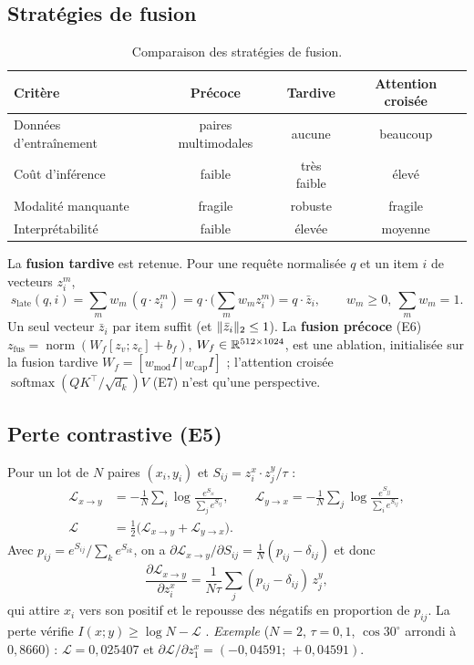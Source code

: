 \subsection{Stratégies de fusion}
\begin{table}[ht]\centering\small
\begin{tabular}{@{}lccc@{}}
\toprule
Critère & Précoce & Tardive & Attention croisée\\
\midrule
Données d'entraînement & paires multimodales & aucune & beaucoup\\
Coût d'inférence & faible & très faible & élevé\\
Modalité manquante & fragile & robuste & fragile\\
Interprétabilité & faible & élevée & moyenne\\
\bottomrule
\end{tabular}
\caption{Comparaison des stratégies de fusion.}
\end{table}
La \textbf{fusion tardive} est retenue. Pour une requête normalisée $q$ et un item $i$ de vecteurs $z_i^m$,
\begin{equation}
  s_{\text{late}}(q,i)=\sum_m w_m\,(q\cdot z_i^m)=q\cdot\Big(\sum_m w_m z_i^m\Big)=q\cdot\bar z_i,\qquad w_m\ge0,\ \sum_m w_m=1 .
\end{equation}
Un seul vecteur $\bar z_i$ par item suffit (et $\lVert \bar z_i\rVert_2\le 1$). La \textbf{fusion précoce} (E6)
$z_{\text{fus}}=\operatorname{norm}(W_f[z_v;z_c]+b_f)$, $W_f\in\mathbb{R}^{512\times1024}$, est une ablation, initialisée sur la fusion tardive
$W_f=[w_{\text{mod}}I\,|\,w_{\text{cap}}I]$ ; l'attention croisée $\operatorname{softmax}(QK^\top/\sqrt{d_k})V$ (E7) n'est qu'une
perspective.

\subsection{Perte contrastive (E5)}
Pour un lot de $N$ paires $(x_i,y_i)$ et $S_{ij}=z^x_i\!\cdot\! z^y_j/\tau$ :
\begin{align}
  \mathcal L_{x\to y}&=-\frac1N\sum_i\log\frac{e^{S_{ii}}}{\sum_j e^{S_{ij}}},\qquad
  \mathcal L_{y\to x}=-\frac1N\sum_j\log\frac{e^{S_{jj}}}{\sum_i e^{S_{ij}}},\\
  \mathcal L&=\tfrac12\big(\mathcal L_{x\to y}+\mathcal L_{y\to x}\big).
\end{align}
Avec $p_{ij}=e^{S_{ij}}/\sum_k e^{S_{ik}}$, on a $\partial\mathcal L_{x\to y}/\partial S_{ij}=\frac1N(p_{ij}-\delta_{ij})$ et donc
\begin{equation}
  \frac{\partial\mathcal L_{x\to y}}{\partial z^x_i}=\frac{1}{N\tau}\sum_j(p_{ij}-\delta_{ij})\,z^y_j ,
\end{equation}
qui attire $x_i$ vers son positif et le repousse des négatifs en proportion de $p_{ij}$. La perte vérifie
$I(x;y)\ge\log N-\mathcal L$ \cite{oord2018cpc}. \emph{Exemple} ($N=2$, $\tau=0{,}1$, $\cos30^\circ$ arrondi à $0{,}8660$) :
$\mathcal L=0{,}025407$ et $\partial\mathcal L/\partial z^x_1=(-0{,}04591;\,+0{,}04591)$.

